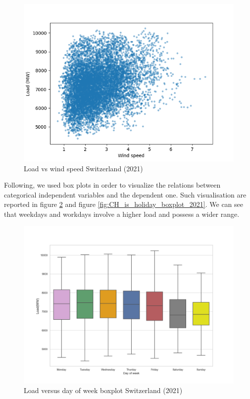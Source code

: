 \begin{figure}[!h]
    \includegraphics[width=\textwidth]{images/CH_load_vs_wind_speed_2021.png}
    \caption{Load vs wind speed Switzerland (2021)}
    \label{fig:CH_load_vs_wind_speed_2021}
\end{figure}

Following, we used box plots in order to visualize the relations between categorical independent variables and the dependent one. Such visualisation are reported in figure \ref{fig:CH_day_of_week_boxplot_2021} and figure \ref{fig:CH_is_holiday_boxplot_2021}. We can see that weekdays and workdays involve a higher load and possess a wider range.

\begin{figure}[!h]
    \includegraphics[width=\textwidth]{images/CH_day_of_week_boxplot_2021.png}
    \caption{Load versus day of week boxplot Switzerland (2021)}
    \label{fig:CH_day_of_week_boxplot_2021}
\end{figure}

